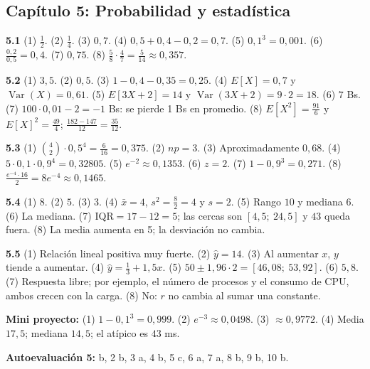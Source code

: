 \subsection*{Cap\'itulo 5: Probabilidad y estad\'istica}
\textbf{5.1}\label{resp:5-1}\quad
(1) $\frac12$. (2) $\frac14$. (3) $0{,}7$. (4) $0{,}5+0{,}4-0{,}2=0{,}7$. (5) $0{,}1^3=0{,}001$. (6) $\frac{0{,}2}{0{,}5}=0{,}4$. (7) $0{,}75$. (8) $\frac58\cdot\frac47=\frac{5}{14}\approx0{,}357$.

\medskip\noindent\textbf{5.2}\label{resp:5-2}\quad
(1) $3{,}5$. (2) $0{,}5$. (3) $1-0{,}4-0{,}35=0{,}25$. (4) $E[X]=0{,}7$ y $\operatorname{Var}(X)=0{,}61$. (5) $E[3X+2]=14$ y $\operatorname{Var}(3X+2)=9\cdot2=18$. (6) $7$ Bs. (7) $100\cdot0{,}01-2=-1$ Bs: se pierde 1 Bs en promedio. (8) $E[X^2]=\frac{91}6$ y $E[X]^2=\frac{49}4$; $\frac{182-147}{12}=\frac{35}{12}$.

\medskip\noindent\textbf{5.3}\label{resp:5-3}\quad
(1) $\binom42\cdot0{,}5^4=\frac6{16}=0{,}375$. (2) $np=3$. (3) Aproximadamente $0{,}68$. (4) $5\cdot0{,}1\cdot0{,}9^4=0{,}32805$. (5) $e^{-2}\approx0{,}1353$. (6) $z=2$. (7) $1-0{,}9^3=0{,}271$. (8) $\frac{e^{-4}\cdot16}{2}=8e^{-4}\approx0{,}1465$.

\medskip\noindent\textbf{5.4}\label{resp:5-4}\quad
(1) $8$. (2) $5$. (3) $3$. (4) $\bar x=4$, $s^2=\frac{8}{2}=4$ y $s=2$. (5) Rango $10$ y mediana $6$. (6) La mediana. (7) $\mathrm{IQR}=17-12=5$; las cercas son $[4{,}5;\ 24{,}5]$ y $43$ queda fuera. (8) La media aumenta en 5; la desviaci\'on no cambia.

\medskip\noindent\textbf{5.5}\label{resp:5-5}\quad
(1) Relaci\'on lineal positiva muy fuerte. (2) $\hat y=14$. (3) Al aumentar $x$, $y$ tiende a aumentar. (4) $\hat y=\frac13+1{,}5x$. (5) $50\pm1{,}96\cdot2=[46{,}08;\ 53{,}92]$. (6) $5{,}8$. (7) Respuesta libre; por ejemplo, el n\'umero de procesos y el consumo de CPU, ambos crecen con la carga. (8) No: $r$ no cambia al sumar una constante.

\medskip\noindent\textbf{Mini proyecto:} (1) $1-0{,}1^3=0{,}999$. (2) $e^{-3}\approx0{,}0498$. (3) $\approx0{,}9772$. (4) Media $17{,}5$; mediana $14{,}5$; el at\'ipico es $43$ ms.

\medskip\noindent\textbf{Autoevaluaci\'on 5:}\label{resp:q5} b, 2 b, 3 a, 4 b, 5 c, 6 a, 7 a, 8 b, 9 b, 10 b.
